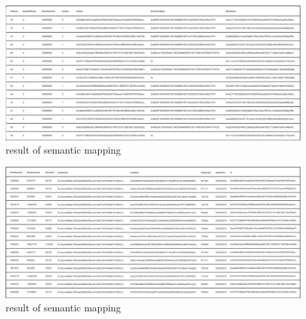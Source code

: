 \begin{center}
	\begin{figure}[htb!]
		
		\begin{minipage}{0.55\linewidth}
			\centering
			\includegraphics[width=1.95\textwidth]{images/chap03_licese_result_1.png}
		\end{minipage}
		\caption[result of semantic mapping]{result of semantic mapping}
		
	\end{figure}
	
\end{center}
\begin{center}
	\begin{figure}[htb!]
		
		\begin{minipage}{0.55\linewidth}
			\centering
			\includegraphics[width=1.95\textwidth]{images/chap03_licese_result_2.png}
		\end{minipage}
		\caption[result of semantic mapping]{result of semantic mapping}
		
	\end{figure}
	
\end{center}